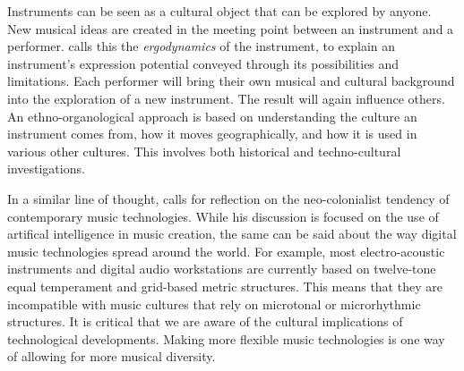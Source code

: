 Instruments can be seen as a cultural object that can be explored by anyone. New musical ideas are created in the meeting point between an instrument and a performer. \citet{magnusson_ergomimesis_2018} calls this the \emph{ergodynamics} of the instrument, to explain an instrument's expression potential conveyed through its possibilities and limitations. Each performer will bring their own musical and cultural background into the exploration of a new instrument. The result will again influence others. An ethno-organological approach is based on understanding the culture an instrument comes from, how it moves geographically, and how it is used in various other cultures. This involves both historical and techno-cultural investigations.

In a similar line of thought, \citet{morreale_where_2021} calls for reflection on the neo-colonialist tendency of contemporary music technologies. While his discussion is focused on the use of artifical intelligence in music creation, the same can be said about the way digital music technologies spread around the world. For example, most electro-acoustic instruments and digital audio workstations are currently based on twelve-tone equal temperament and grid-based metric structures. This means that they are incompatible with music cultures that rely on microtonal or microrhythmic structures. It is critical that we are aware of the cultural implications of technological developments. Making more flexible music technologies is one way of allowing for more musical diversity.
